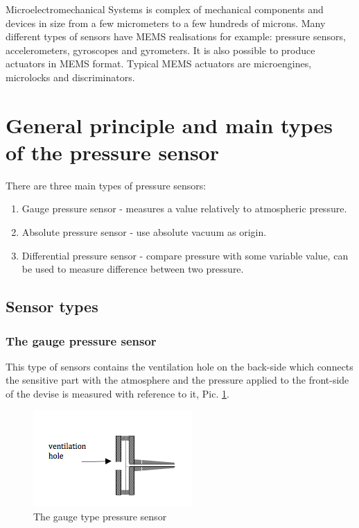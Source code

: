 \documentclass[english]{article}
\begin{document}
Microelectromechanical Systems is complex of mechanical components and devices in size from a few micrometers to a few hundreds of microns. Many different types of sensors have MEMS realisations for example: pressure sensors, accelerometers, gyroscopes and gyrometers. It is also possible to produce actuators in MEMS format. Typical MEMS actuators are microengines, microlocks and discriminators.\cite{mems}\\

\section{General principle and main types of the pressure sensor}
There are three main types of pressure sensors:

\begin{enumerate}
\item Gauge pressure sensor - measures a value relatively to atmospheric pressure.
\item Absolute pressure sensor - use absolute vacuum as origin.
\item Differential pressure sensor - compare pressure with some variable value, can be used to measure difference between two pressure.
\end{enumerate}

\subsection{Sensor types}

\subsubsection{The gauge pressure sensor}

This type of sensors contains the ventilation hole on the back-side which connects the sensitive part with the atmosphere and the pressure applied to the front-side of the devise is measured with reference to it, Pic. \ref{fig:gauge}.\\

\begin{figure}[H]
\centerline{\includegraphics[scale=1]{PressureSensors/gauge}}
\caption{The gauge type pressure sensor \label{fig:gauge}}
\end{figure}
\end{document}
